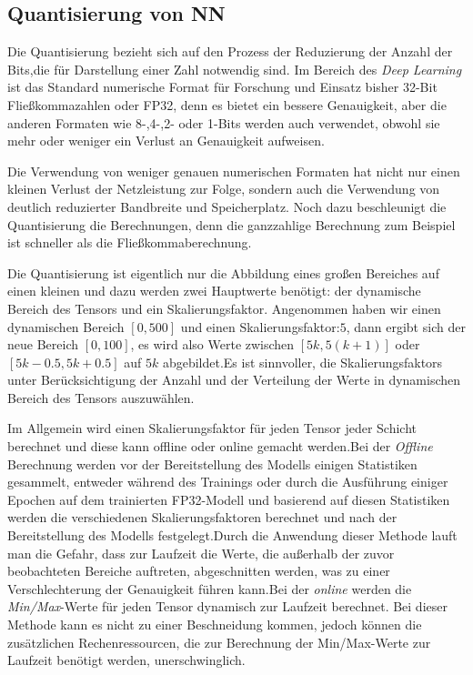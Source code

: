 \documentclass[12pt,a4paper]{scrartcl}
\numberwithin{equation}{section}
\begin{document}
\subsection{ Quantisierung von \ac{NN}}
Die Quantisierung \cite{quantization1} bezieht sich auf den Prozess der Reduzierung der Anzahl der Bits,die für Darstellung einer Zahl notwendig sind. Im Bereich des \textit{Deep Learning} ist das Standard numerische Format für Forschung und Einsatz bisher 32-Bit Fließkommazahlen oder FP32, denn es bietet ein bessere Genauigkeit, aber die anderen Formaten wie 8-,4-,2- oder 1-Bits werden auch verwendet, obwohl sie mehr oder weniger ein Verlust an Genauigkeit aufweisen.

Die Verwendung von weniger genauen numerischen Formaten hat nicht nur einen kleinen Verlust der Netzleistung zur Folge, sondern auch die Verwendung von deutlich reduzierter Bandbreite und Speicherplatz. Noch dazu beschleunigt die Quantisierung die Berechnungen, denn die ganzzahlige Berechnung zum Beispiel ist schneller als die Fließkommaberechnung.

Die Quantisierung ist eigentlich nur die Abbildung eines großen Bereiches auf einen kleinen und dazu werden zwei Hauptwerte benötigt: der dynamische Bereich des Tensors und ein Skalierungsfaktor.
Angenommen haben wir einen dynamischen Bereich $ [0,500] $ und einen Skalierungsfaktor:$ 5 $, dann ergibt sich der neue Bereich $ [0, 100] $, es wird also Werte zwischen $ [5k, 5(k+1)] $ oder $ [5k -0.5, 5k +0.5] $ auf $ 5k $ abgebildet.Es ist sinnvoller,  die Skalierungsfaktors unter Berücksichtigung der Anzahl und der Verteilung der Werte in dynamischen Bereich des Tensors auszuwählen.

Im Allgemein wird  einen Skalierungsfaktor für jeden Tensor jeder Schicht berechnet und diese kann offline oder online gemacht werden.Bei der \textit{Offline} Berechnung werden vor der Bereitstellung des Modells einigen Statistiken gesammelt, entweder während des Trainings oder durch die Ausführung einiger Epochen auf dem trainierten FP32-Modell und basierend auf diesen Statistiken werden die verschiedenen Skalierungsfaktoren berechnet und nach der Bereitstellung des Modells festgelegt.Durch die Anwendung dieser Methode lauft man die Gefahr, dass zur Laufzeit die Werte, die außerhalb der zuvor beobachteten Bereiche auftreten, abgeschnitten werden, was zu einer Verschlechterung der Genauigkeit führen kann.Bei der \textit{online} werden die \textit{Min/Max}-Werte für jeden Tensor dynamisch zur Laufzeit berechnet. Bei dieser Methode kann es nicht zu einer Beschneidung kommen, jedoch können die zusätzlichen Rechenressourcen, die zur Berechnung der Min/Max-Werte zur Laufzeit benötigt werden, unerschwinglich.\cite{quantization1}\\
\end{document}
